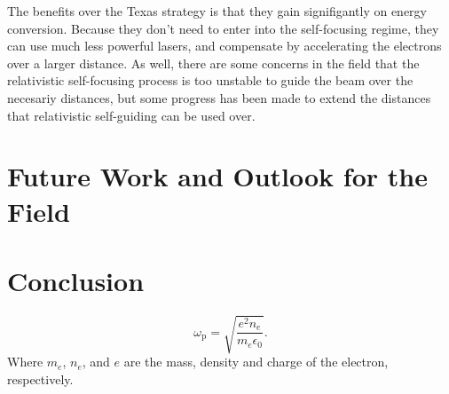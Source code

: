 \documentclass[12pt,letter]{article}
\begin{document}
The benefits over the Texas strategy is that they gain signifigantly on energy
conversion. Because they don't need to enter into the self-focusing regime,
they can use much less powerful lasers, and compensate by accelerating the
electrons over a larger distance. As well, there are some concerns in the field
that the relativistic self-focusing process is too unstable to guide the beam
over the necesariy distances\cite{RevModPhys.81.1229}, but some progress has
been made to extend the distances that relativistic self-guiding can be used
over\cite{PhysRevLett.113.245001}.


\section{Future Work and Outlook for the Field}
\section{Conclusion}
    \begin{equation}
        \label{eq:wp}
        \omega_\mathrm{p} = \sqrt{\frac{e^2 n_e}{m_e \epsilon_0}}.
    \end{equation}
    Where $m_e$, $n_e$, and $e$ are the mass, density and charge of the electron, respectively.

\end{document}
